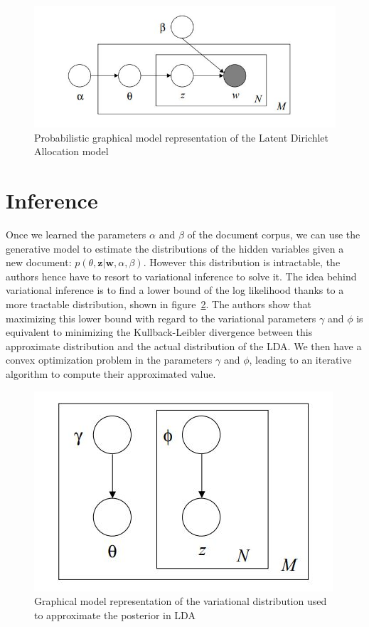 \documentclass[12pt,a4paper,onecolumn]{article}
\begin{document}
\begin{figure}[H]
	\centerline{\includegraphics[height = 0.20\textheight]{Figure0.JPG}}
	\caption{Probabilistic graphical model representation of the Latent Dirichlet Allocation model}\label{fig1}
\end{figure}


\section{Inference}

Once we learned the parameters $\alpha$ and $\beta$ of the document corpus, we can use the generative model to estimate the distributions of the hidden variables given a new document: $p(\theta, \bm{z}|\bm{w}, \alpha, \beta)$. However this distribution is intractable, the authors hence have to resort to variational inference to solve it. The idea behind variational inference is to find a lower bound of the log likelihood thanks to a more tractable distribution, shown in figure~\ref{fig2}. The authors show that maximizing this lower bound with regard to the variational parameters $\gamma$ and $\phi$ is equivalent to minimizing the Kullback-Leibler divergence between this approximate distribution and the actual distribution of the LDA. We then have a convex optimization problem in the parameters $\gamma$ and $\phi$, leading to an iterative algorithm to compute their approximated value.

\begin{figure}
	\centerline{\includegraphics[height = 0.25\textheight]{Figure0_1.JPG}}
	\caption{Graphical model representation of the variational distribution used to approximate the posterior in LDA}\label{fig2}
\end{figure}
\end{document}
